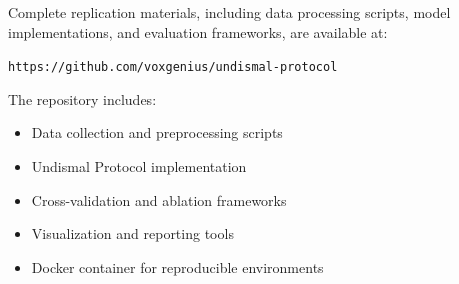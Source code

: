 \documentclass[11pt,a4paper]{article}
\begin{document}
Complete replication materials, including data processing scripts, model implementations, and evaluation frameworks, are available at:

\texttt{https://github.com/voxgenius/undismal-protocol}

The repository includes:
\begin{itemize}
\item Data collection and preprocessing scripts
\item Undismal Protocol implementation
\item Cross-validation and ablation frameworks
\item Visualization and reporting tools
\item Docker container for reproducible environments
\end{itemize}
\end{document}
